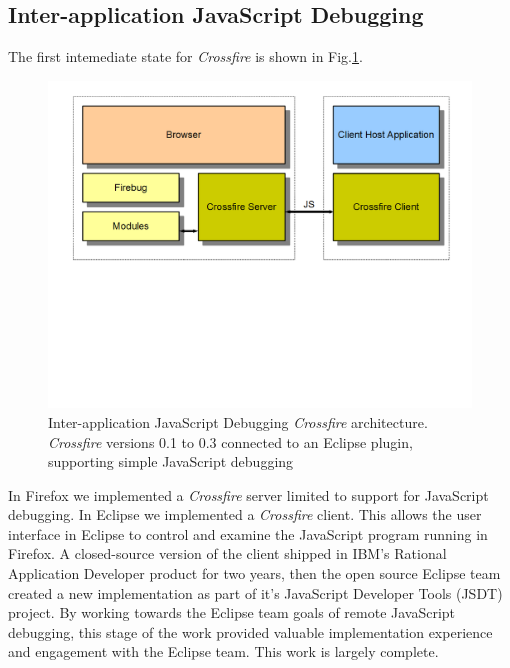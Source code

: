 \subsection{Inter-application JavaScript Debugging}
The first intemediate state for \textit{Crossfire} is shown in Fig.\ref{fig:fireclipse}.  
\begin{figure}
  \includegraphics  [width = 86 mm] {figures/fireclipse.png}
  \caption{Inter-application JavaScript Debugging \textit{Crossfire} architecture. 
\textit{Crossfire} versions 0.1 to 0.3 connected to an Eclipse plugin, supporting simple JavaScript debugging}
 \label{fig:fireclipse}
\end{figure}
In Firefox we implemented a \textit{Crossfire} server limited to support for JavaScript debugging. 
In Eclipse we implemented a \textit{Crossfire} client. This allows the user interface in Eclipse to control
 and examine the JavaScript program running
in Firefox.  A closed-source version of the client shipped in IBM's Rational Application Developer product for two years, 
then the open source Eclipse team created a new implementation as part of it's JavaScript Developer 
Tools (JSDT) project\cite{JSDT}.  By working towards the Eclipse team goals of remote JavaScript debugging, 
this stage of the work provided valuable implementation experience and engagement with the Eclipse team.
This work is largely complete.

